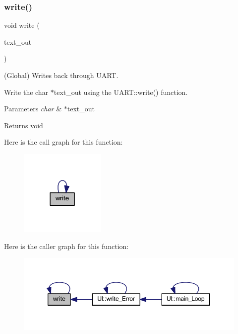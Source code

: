 \subsubsection{\texorpdfstring{write()}{write()}}
{\footnotesize\ttfamily void write (\begin{DoxyParamCaption}\item[{char $\ast$}]{text\+\_\+out }\end{DoxyParamCaption})}



(Global) Writes back through U\+A\+RT. 

Write the char $\ast$text\+\_\+out using the U\+A\+R\+T\+::write() function.


\begin{DoxyParams}{Parameters}
{\em char} & $\ast$text\+\_\+out \\
\hline
\end{DoxyParams}
\begin{DoxyReturn}{Returns}
void 
\end{DoxyReturn}
Here is the call graph for this function\+:\nopagebreak
\begin{figure}[H]
\begin{center}
\leavevmode
\includegraphics[width=117pt]{namespace_i_o_a20b32a5769a95ed363726431c01702e9_cgraph}
\end{center}
\end{figure}
Here is the caller graph for this function\+:\nopagebreak
\begin{figure}[H]
\begin{center}
\leavevmode
\includegraphics[width=346pt]{namespace_i_o_a20b32a5769a95ed363726431c01702e9_icgraph}
\end{center}
\end{figure}
